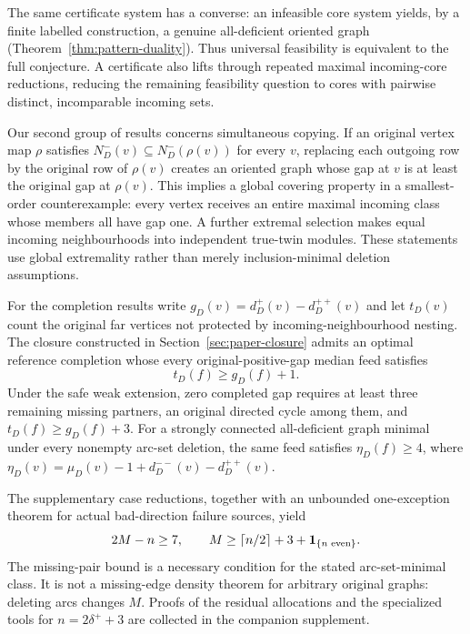 The same certificate system has a converse: an infeasible core system yields,
by a finite labelled construction, a genuine all-deficient oriented graph
(Theorem~\ref{thm:pattern-duality}). Thus universal feasibility is equivalent
to the full conjecture. A certificate also lifts through repeated maximal
incoming-core reductions, reducing the remaining feasibility question to
cores with pairwise distinct, incomparable incoming sets.

Our second group of results concerns simultaneous copying. If an original
vertex map $\rho$ satisfies $N_D^-(v)\subseteq N_D^-(\rho(v))$ for every $v$,
replacing each outgoing row by the original row of $\rho(v)$ creates an
oriented graph whose gap at $v$ is at least the original gap at $\rho(v)$.
This implies a global covering property in a smallest-order counterexample:
every vertex receives an entire maximal incoming class whose members all have
gap one. A further extremal selection makes equal incoming neighbourhoods into
independent true-twin modules. These statements use global extremality rather
than merely inclusion-minimal deletion assumptions.

For the completion results write $g_D(v)=d_D^+(v)-d_D^{++}(v)$ and let $t_D(v)$
count the original far vertices not protected by incoming-neighbourhood nesting.
The closure constructed in Section~\ref{sec:paper-closure} admits an optimal
reference completion whose every original-positive-gap median feed satisfies
\begin{equation}\label{eq:intro-surplus}
 t_D(f)\ge g_D(f)+1.
\end{equation}
Under the safe weak extension, zero completed gap requires at least three
remaining missing partners, an original directed cycle among them, and
$t_D(f)\ge g_D(f)+3$. For a strongly connected all-deficient graph minimal
under every nonempty arc-set deletion, the same feed satisfies
$\eta_D(f)\ge4$, where
$\eta_D(v)=\mu_D(v)-1+d_D^{--}(v)-d_D^{++}(v)$.

The supplementary case reductions, together with an unbounded one-exception
theorem for actual bad-direction failure sources, yield
\begin{equation}\label{eq:intro-residual}
 2M-n\ge7,\qquad
 M\ge\left\lceil n/2\right\rceil+3+\mathbf 1_{\{n\text{ even}\}}.
\end{equation}
The missing-pair bound is a necessary condition for the stated arc-set-minimal
class. It is not a missing-edge density theorem for arbitrary original graphs:
deleting arcs changes $M$. Proofs of the residual allocations and the specialized
tools for $n=2\delta^++3$ are collected in the companion supplement.

